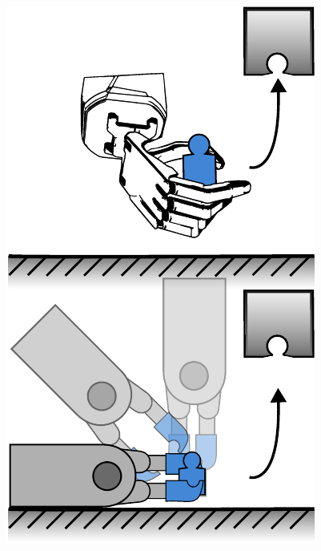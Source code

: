 \begin{figure}[h]
\begin{center}
\begin{minipage}{.24\linewidth}
			\includegraphics[width=.95\textwidth]{chapters/introduction/fig/pipeline-4.pdf}
		\end{minipage}%
		\vspace{15pt}
		\begin{minipage}[t]{.24\linewidth}
			\vspace{0pt}
			\captionsetup{type=figure}
			\label{fig:pre-grasp-phase}
		\end{minipage}%
		\hfill%
		\begin{minipage}[t]{.24\linewidth}
			\vspace{0pt}

\end{minipage}
\end{center}
\end{figure}
